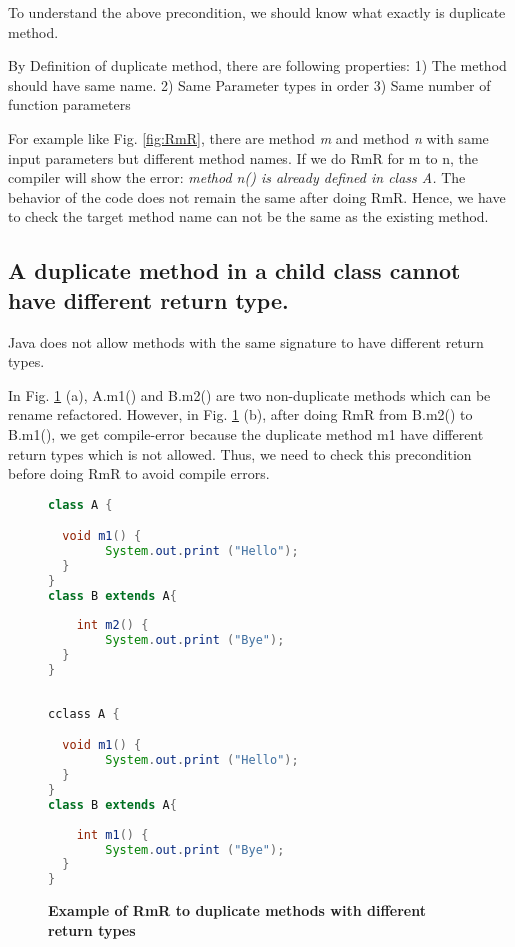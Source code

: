 To understand the above precondition, we should know what exactly is duplicate method.

By Definition of duplicate method, there are following properties:
1) The method should have same name.
2) Same Parameter types in order
3) Same number of function parameters

For example like Fig. \ref{fig:RmR}, there are method \textsl{m} and method \textsl{n} with same input parameters but different method names. If we do RmR for m to n, the compiler will show the error: \textsl{method n() is already defined in class A.} The behavior of the code does not remain the same after doing RmR. Hence, we have to check the target method name can not be the same as the existing method.

\subsection{A duplicate method in a child class cannot have different return type.}

Java does not allow methods with the same signature to have different return types.

In Fig. \ref{fig:RmR2} (a), A.m1() and B.m2() are two non-duplicate methods which can be rename refactored. However, in Fig. \ref{fig:RmR2} (b), after doing RmR from B.m2() to B.m1(), we get compile-error because the duplicate method m1 have different return types which is not allowed. Thus, we need to check this precondition before doing RmR to avoid compile errors.

\begin{figure}[th]
\centering
\begin{minipage}[t]{0.45\linewidth}
\begin{lstlisting}[language=java, basicstyle=\scriptsize\ttfamily,frame=single]
class A {

  void m1() {
		System.out.print ("Hello");
  }
}
class B extends A{
 
	int m2() {
		System.out.print ("Bye");
  }	
}
 
\end{lstlisting}
\end{minipage}
\hfill
\begin{minipage}[t]{0.45\linewidth}
\begin{lstlisting}[language=java, basicstyle=\scriptsize\ttfamily,frame=single]
cclass A {

  void m1() {
		System.out.print ("Hello");
  }
}
class B extends A{
 
	int m1() {
		System.out.print ("Bye");
  }	
}

\end{lstlisting}
\end{minipage}
\caption{\textbf{Example of RmR to duplicate methods with different return types}}
\label{fig:RmR2}
\end{figure}

